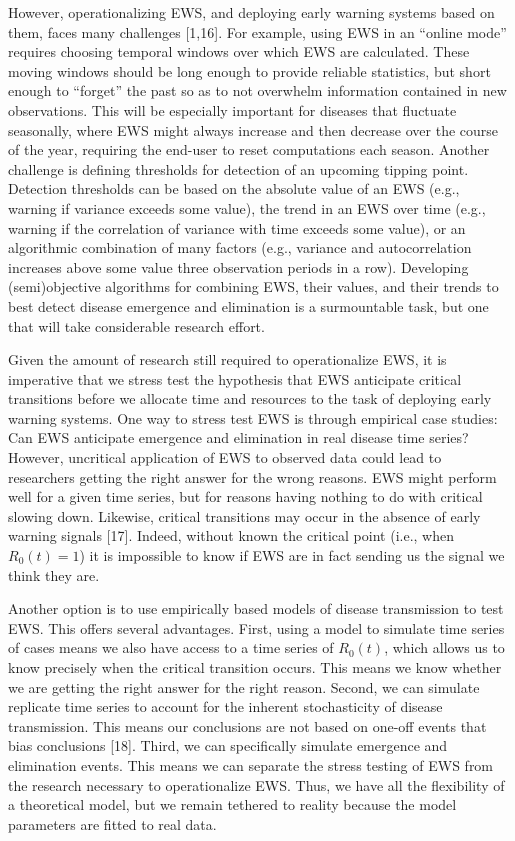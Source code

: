 \documentclass[3p]{elsarticle} %
\begin{document}
However, operationalizing EWS, and deploying early warning systems based
on them, faces many challenges {[}1,16{]}. For example, using EWS in an
``online mode'' requires choosing temporal windows over which EWS are
calculated. These moving windows should be long enough to provide
reliable statistics, but short enough to ``forget'' the past so as to
not overwhelm information contained in new observations. This will be
especially important for diseases that fluctuate seasonally, where EWS
might always increase and then decrease over the course of the year,
requiring the end-user to reset computations each season. Another
challenge is defining thresholds for detection of an upcoming tipping
point. Detection thresholds can be based on the absolute value of an EWS
(e.g., warning if variance exceeds some value), the trend in an EWS over
time (e.g., warning if the correlation of variance with time exceeds
some value), or an algorithmic combination of many factors (e.g.,
variance and autocorrelation increases above some value three
observation periods in a row). Developing (semi)objective algorithms for
combining EWS, their values, and their trends to best detect disease
emergence and elimination is a surmountable task, but one that will take
considerable research effort.

Given the amount of research still required to operationalize EWS, it is
imperative that we stress test the hypothesis that EWS anticipate
critical transitions before we allocate time and resources to the task
of deploying early warning systems. One way to stress test EWS is
through empirical case studies: Can EWS anticipate emergence and
elimination in real disease time series? However, uncritical application
of EWS to observed data could lead to researchers getting the right
answer for the wrong reasons. EWS might perform well for a given time
series, but for reasons having nothing to do with critical slowing down.
Likewise, critical transitions may occur in the absence of early warning
signals {[}17{]}. Indeed, without known the critical point (i.e., when
\(R_0(t) = 1\)) it is impossible to know if EWS are in fact sending us
the signal we think they are.

Another option is to use empirically based models of disease
transmission to test EWS. This offers several advantages. First, using a
model to simulate time series of cases means we also have access to a
time series of \(R_0(t)\), which allows us to know precisely when the
critical transition occurs. This means we know whether we are getting
the right answer for the right reason. Second, we can simulate replicate
time series to account for the inherent stochasticity of disease
transmission. This means our conclusions are not based on one-off events
that bias conclusions {[}18{]}. Third, we can specifically simulate
emergence and elimination events. This means we can separate the stress
testing of EWS from the research necessary to operationalize EWS. Thus,
we have all the flexibility of a theoretical model, but we remain
tethered to reality because the model parameters are fitted to real
data.
\end{document}
